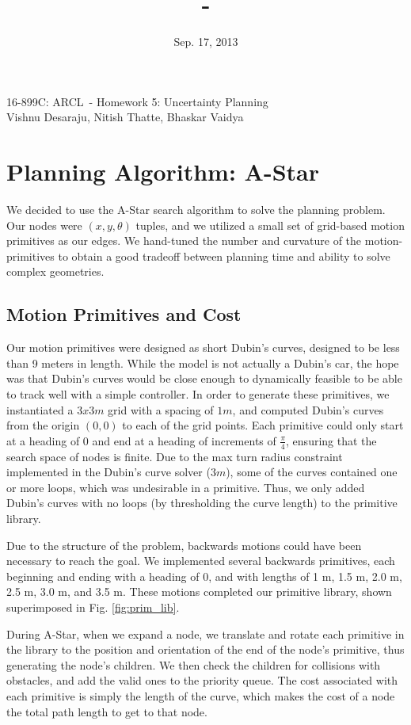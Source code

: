 \documentclass{article}
\title{\hwkTitle\ -\ \hwkClass}
\author{\hwkAuthor}
\date{Sep. 17, 2013}
\newcommand{\hwkTitle}{Homework 5: Uncertainty Planning}
\newcommand{\hwkAuthor}{Vishnu Desaraju, Nitish Thatte, Bhaskar Vaidya}
\newcommand{\hwkClass}{16-899C: ARCL}
\newcommand{\insertTitle}{\begin{center}\LARGE{\hwkClass\ - \hwkTitle} \\ \large{\hwkAuthor} \end{center}}
\begin{document}
\insertTitle
\vspace*{3ex}

\section{Planning Algorithm: A-Star}

We decided to use the A-Star search algorithm to solve the planning problem. Our nodes were $(x, y, \theta)$ tuples, and we utilized a small set of grid-based motion primitives as our edges. We hand-tuned the number and curvature of the motion-primitives to obtain a good tradeoff between planning time and ability to solve complex geometries.

\subsection{Motion Primitives and Cost}

Our motion primitives were designed as short Dubin's curves, designed to be less than 9 meters in length. While the model is not actually a Dubin's car, the hope was that Dubin's curves would be close enough to dynamically feasible to be able to track well with a simple controller. In order to generate these primitives, we instantiated a $3x3 m$ grid with a spacing of $1 m$, and computed Dubin's curves from the origin $(0,0)$ to each of the grid points. Each primitive could only start at a heading of $0$ and end at a heading of increments of $\frac{\pi}{4}$, ensuring that the search space of nodes is finite. Due to the max turn radius constraint implemented in the Dubin's curve solver ($3 m$), some of the curves contained one or more loops, which was undesirable in a primitive. Thus, we only added Dubin's curves with no loops (by thresholding the curve length) to the primitive library.

Due to the structure of the problem, backwards motions could have been necessary to reach the goal. We implemented several backwards primitives, each beginning and ending with a heading of $0$, and with lengths of 1 m, 1.5 m, 2.0 m, 2.5 m, 3.0 m, and 3.5 m. These motions completed our primitive library, shown superimposed in Fig. \ref{fig:prim_lib}.


During A-Star, when we expand a node, we translate and rotate each primitive in the library to the position and orientation of the end of the node's primitive, thus generating the node's children. We then check the children for collisions with obstacles, and add the valid ones to the priority queue. The cost associated with each primitive is simply the length of the curve, which makes the cost of a node the total path length to get to that node.
\end{document}

